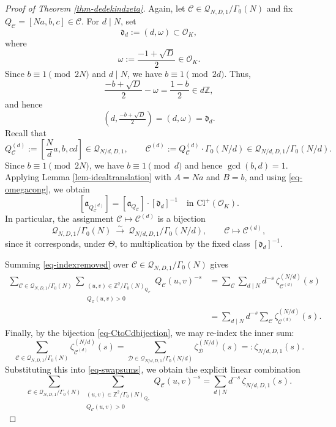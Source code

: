 \documentclass[12pt]{amsart}
\numberwithin{equation}{section}
\theoremstyle{definition}
\begin{document}
\begin{proof}[Proof of Theorem \ref{thm-dedekindzeta}]
Again, let $\mathcal{C}\in\mathcal{Q}_{N,D,1}/\Gamma_{0}(N)$ and fix $Q_{\mathcal{C}}=[Na,b,c]\in\mathcal{C}$.
For $d\mid N$, set
\[
\mathfrak{d}_{d}:=(d,\omega)\subset\mathcal{O}_{K},
\]
where
$$\omega:=\frac{-1+\sqrt{D}}{2}\in\mathcal{O}_{K}.$$
Since $b\equiv 1\pmod{2N}$ and $d\mid N$, we have $b\equiv 1\pmod{2d}$. Thus,
$$\frac{-b+\sqrt{D}}{2}-\omega=\frac{1-b}{2}\in d\mathbb{Z},$$
and hence
\begin{equation}\label{eq-omegacong}
(d,\tfrac{-b+\sqrt{D}}{2})=(d,\omega)=\mathfrak{d}_{d}.
\end{equation}
Recall that
\[
Q_{\mathcal{C}}^{(d)}:=\left[\frac{N}{d}a,b,cd\right]\in\mathcal{Q}_{N/d,D,1},
\qquad
\mathcal{C}^{(d)}:=Q_{\mathcal{C}}^{(d)}\cdot\Gamma_{0}(N/d)\in \mathcal{Q}_{N/d,D,1}/\Gamma_{0}(N/d).
\]
Since $b\equiv 1\pmod{2N}$, we have $b\equiv 1\pmod{d}$ and hence $\gcd(b,d)=1$.
Applying Lemma \ref{lem-idealtranslation} with $A=Na$ and $B=b$, and using \eqref{eq-omegacong}, we obtain
\begin{equation}\label{eq-classtranslatefixed}
[\mathfrak{a}_{Q_{\mathcal{C}}^{(d)}}]=[\mathfrak{a}_{Q_{\mathcal{C}}}]\cdot [\mathfrak{d}_{d}]^{-1}
\quad\text{in }\mathrm{Cl}^{+}(\mathcal{O}_{K}).
\end{equation}
In particular, the assignment $\mathcal{C}\mapsto \mathcal{C}^{(d)}$ is a bijection
\begin{equation}\label{eq-CtoCdbijection}
\mathcal{Q}_{N,D,1}/\Gamma_{0}(N)\ \xrightarrow{\sim}\ \mathcal{Q}_{N/d,D,1}/\Gamma_{0}(N/d),
\qquad \mathcal{C}\longmapsto \mathcal{C}^{(d)},
\end{equation}
since it corresponds, under $\Theta$, to multiplication by the fixed class $[\mathfrak{d}_{d}]^{-1}$.

Summing \eqref{eq-indexremoved} over $\mathcal{C}\in\mathcal{Q}_{N,D,1}/\Gamma_{0}(N)$ gives
\begin{align}
\sum_{\mathcal{C}\in\mathcal{Q}_{N,D,1}/\Gamma_{0}(N)}
\sum_{\substack{(u,v)\in\mathbb{Z}^{2}/\Gamma_{0}(N)_{Q_{\mathcal{C}}} \\ Q_{\mathcal{C}}(u,v)>0}}
Q_{\mathcal{C}}(u,v)^{-s}
&=\sum_{\mathcal{C}}\sum_{d\mid N}d^{-s}\,\zeta_{\mathcal{C}^{(d)}}^{(N/d)}(s)\nonumber\\
&=\sum_{d\mid N}d^{-s}\sum_{\mathcal{C}}\zeta_{\mathcal{C}^{(d)}}^{(N/d)}(s).\label{eq-swapsums}
\end{align}
Finally, by the bijection \eqref{eq-CtoCdbijection}, we may re-index the inner sum:
\[
\sum_{\mathcal{C}\in\mathcal{Q}_{N,D,1}/\Gamma_{0}(N)}\zeta_{\mathcal{C}^{(d)}}^{(N/d)}(s)
=
\sum_{\mathcal{D}\in\mathcal{Q}_{N/d,D,1}/\Gamma_{0}(N/d)}\zeta_{\mathcal{D}}^{(N/d)}(s)
=:\zeta_{N/d,D,1}(s).
\]
Substituting this into \eqref{eq-swapsums}, we obtain the explicit linear combination
\begin{equation}\label{eq-finallinearcomb}
\sum_{\mathcal{C}\in\mathcal{Q}_{N,D,1}/\Gamma_{0}(N)}
\sum_{\substack{(u,v)\in\mathbb{Z}^{2}/\Gamma_{0}(N)_{Q_{\mathcal{C}}} \\ Q_{\mathcal{C}}(u,v)>0}}
Q_{\mathcal{C}}(u,v)^{-s}
=
\sum_{d\mid N} d^{-s}\,\zeta_{N/d,D,1}(s).
\end{equation}


\end{proof}
\end{document}
